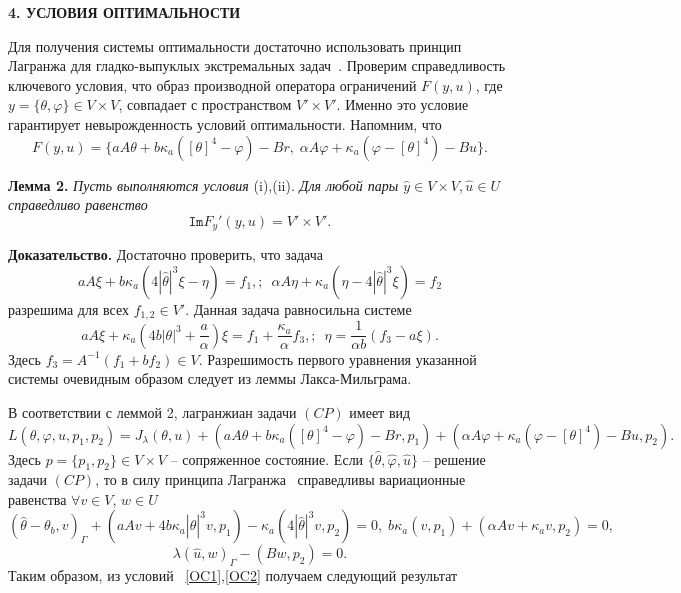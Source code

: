 \documentclass[12pt]{article}
\begin{document}
    \begin{center}
        \textbf{4. УСЛОВИЯ ОПТИМАЛЬНОСТИ}
    \end{center}

    Для получения системы оптимальности достаточно использовать
    принцип Лагранжа для гладко-выпуклых экстремальных задач~\cite{10,11}.
    Проверим справедливость ключевого условия, что образ производной
    оператора ограничений $F(y, u)$, где $y=\{\theta,\varphi\}\in V\times V$,
    совпадает с пространством $V'\times V'.$ Именно это условие гарантирует
    невырожденность условий оптимальности.
    Напомним, что
    \[
        F(y, u) = \{ aA\theta + b \kappa_a ( [\theta]^4- \varphi) - Br,\;
        \alpha A \varphi + \kappa_a (\varphi -[\theta]^4) - Bu\}.
    \]


    \textbf{Лемма 2.}
    \textit{Пусть выполняются условия} (i),(ii).
    \textit{Для любой пары $\hat{y} \in V \times V, \hat{u} \in U$ справедливо равенство}
    \[
        \texttt{Im}F_y'(y, u) = V' \times V'.
    \]


    \textbf{Доказательство.} Достаточно проверить, что задача
    \[
        aA \xi + b \kappa_a (4|\hat{\theta}|^3 \xi - \eta) = f_1, ;\ \;
        \alpha A \eta + \kappa_a (\eta - 4|\hat{\theta}|^3 \xi) = f_2
    \]
    разрешима для всех $f_{1,2}\in V'.$ Данная задача равносильна системе
    \[
        aA\xi + \kappa_a\left(4b|\theta|^3 + \frac{a}{\alpha}\right) \xi = f_1
        +\frac{\kappa_a}{\alpha}f_3, ;\ \;
        \eta =\frac{1}{\alpha b}( f_3-a\xi).
    \]
    Здесь $f_3=A^{-1}(f_1+bf_2)\in V.$ Разрешимость первого уравнения указанной системы
    очевидным образом следует из леммы Лакса-Мильграма.


    В соответствии с леммой 2, лагранжиан задачи $(CP)$ имеет вид
    \[
        L(\theta, \varphi, u, p_1, p_2) = J_\lambda(\theta, u)
        + (aA\theta + b\kappa_a([\theta]^4 - \varphi) - Br, p_1)
        + (\alpha A \varphi + \kappa_a(\varphi - [\theta]^4) - Bu, p_2).
    \]
    Здесь $p=\{p_1,p_2\}\in V\times V$ -- сопряженное состояние.
    Если $\{\hat{\theta}, \hat{\varphi}, \hat{u} \}$ -- решение задачи $(CP)$, то в силу принципа
    Лагранжа~\cite[Теорема 1.5]{10} справедливы вариационные равенства $\forall v\in V,\, w\in U$
    \begin{equation}
        \label{OC1}
        (\hat{\theta} -\theta_b, v)_\Gamma + (aAv + 4 b\kappa_a |\hat{\theta}|^3v, p_1)
        - \kappa_a ( 4 |\hat{\theta}|^3v, p_2) = 0,\;
        b \kappa_a (v, p_1)+ (\alpha A v + \kappa_a v, p_2) = 0,
    \end{equation}
    \begin{equation}
        \label{OC2}
        \lambda(\hat{u},w)_\Gamma - (Bw, p_2) = 0.
    \end{equation}
    Таким образом, из условий ~\eqref{OC1},\eqref{OC2}
    получаем следующий результат
\end{document}
